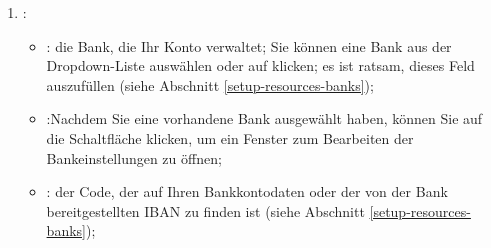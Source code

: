 \begin{enumerate}
\begin{itemize}
	\end{itemize}
	\item {}:
	\begin{itemize}
		\item {}: die Bank, die Ihr Konto verwaltet; Sie können eine Bank aus der Dropdown-Liste auswählen oder auf  klicken; es ist ratsam, dieses Feld auszufüllen (siehe Abschnitt \vref{setup-resources-banks});
		\item {}:Nachdem Sie eine vorhandene Bank ausgewählt haben, können Sie auf die Schaltfläche  klicken, um ein Fenster zum Bearbeiten der Bankeinstellungen zu öffnen;
		\item {}: der Code, der auf Ihren Bankkontodaten oder der von der Bank bereitgestellten IBAN zu finden ist (siehe Abschnitt \vref{setup-resources-banks});

\end{itemize}
\end{enumerate}

